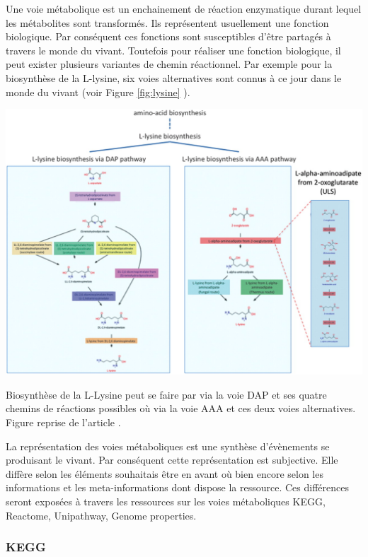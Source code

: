 \begin{refsegment}
    Une voie métabolique est un enchainement de réaction enzymatique durant lequel les métabolites sont transformés. Ils représentent usuellement une fonction biologique. Par conséquent ces fonctions sont susceptibles d'être partagés à travers le monde du vivant. Toutefois pour réaliser une fonction biologique, il peut exister plusieurs variantes de chemin réactionnel. Par exemple pour la biosynthèse de la L-lysine, six voies alternatives sont connus à ce jour dans le monde du vivant (voir Figure \ref{fig:lysine} ).
    	
    	
    	\begin{shadedfigure}
    		\centering
    		\includegraphics[width=\textwidth]{img/L-lysine-biosynthesis.jpg}
    		\caption{Biosynthèse de la L-Lysine peut se faire par via la voie DAP et ses quatre chemins de réactions possibles où via la voie AAA et ces deux voies alternatives. Figure reprise de l'article . }
    		\label{fig:lysine}
    	\end{shadedfigure}
     
     La représentation des voies métaboliques est une synthèse d'évènements se produisant le vivant. Par conséquent cette représentation est subjective. Elle diffère selon les éléments souhaitais être en avant où bien encore selon les informations et les meta-informations dont dispose la ressource. Ces différences seront exposées à travers les ressources sur les voies métaboliques KEGG, Reactome, Unipathway, Genome properties.
     
    \subsubsection{KEGG}
    

\end{refsegment}
